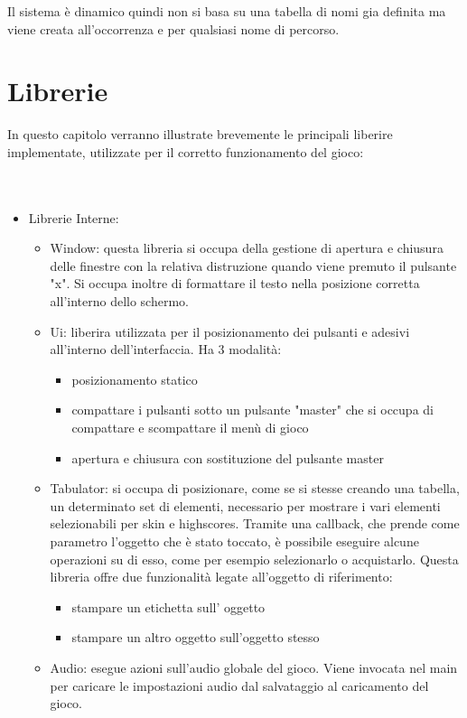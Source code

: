 \documentclass[12pt]{article}
\begin{document}
Il sistema è dinamico quindi non si basa 
su una tabella di nomi gia definita ma viene creata all’occorrenza e per qualsiasi nome di percorso.

\section{Librerie}
In questo capitolo verranno illustrate brevemente le principali liberire implementate, utilizzate per il corretto funzionamento del gioco:
\\
\\\\
\begin{itemize}
    \item Librerie Interne: 
    \begin{itemize}
        \item Window: questa libreria si occupa della gestione di apertura e chiusura delle finestre con la relativa distruzione quando viene premuto il pulsante "x". Si occupa inoltre di formattare il testo nella posizione corretta all'interno dello schermo.
         \item Ui: liberira utilizzata per il posizionamento dei pulsanti e adesivi all'interno dell'interfaccia. Ha 3 modalità:
            \begin{itemize}
                \item posizionamento statico 
                \item compattare i pulsanti sotto un pulsante "master" che si occupa di compattare e scompattare il menù di gioco
                \item apertura e chiusura con sostituzione del pulsante master
            \end{itemize}
        \item Tabulator: si occupa di posizionare, come se si stesse creando una tabella, un determinato set di elementi, necessario per mostrare i vari elementi selezionabili per skin e highscores. Tramite una callback, che prende come parametro l'oggetto che è stato toccato, è possibile eseguire alcune operazioni su di esso, come per esempio selezionarlo o acquistarlo. Questa libreria offre due funzionalità legate all'oggetto di riferimento:
        \begin{itemize}
            \item stampare un etichetta sull’ oggetto
            \item stampare un altro oggetto sull'oggetto stesso
        \end{itemize}
         \item Audio: esegue azioni sull'audio globale del gioco. Viene invocata nel main per caricare le impostazioni audio dal salvataggio al caricamento del gioco.
         

\end{itemize}
\end{itemize}
\end{document}
